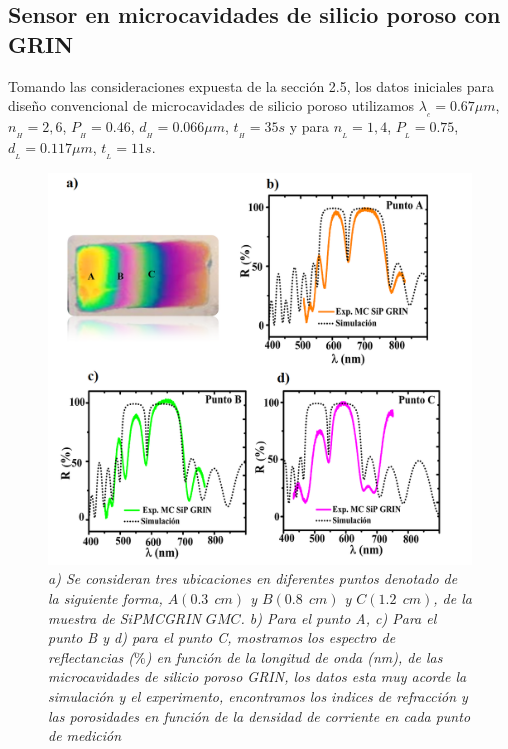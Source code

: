 \documentclass[a4paper,11pt,]{book}
\begin{document}
\subsection{Sensor en microcavidades de silicio poroso con GRIN }
Tomando las consideraciones expuesta de la sección 2.5,  los  datos iniciales para diseño convencional de microcavidades de silicio poroso  utilizamos $\lambda_{_{c}}= 0.67 \mu m$, $n_{_{H}} =2,6$, $P_{_{H}} =0.46$, $d_{_{H}}=0.066 \mu m  $, $t_{_{H}}=35 s  $ y para  $n_{_{L}}= 1,4$,  $P_{_{L}} =0.75$, $d_{_{L}}=0.117 \mu m  $, $t_{_{L}}=11 s  $. 
\begin{figure}[H]
	\centering
	\includegraphics[scale=.3]{../Images/MCGRIN1}
	\caption{\emph{a) Se consideran tres ubicaciones en diferentes puntos denotado de la siguiente forma,  $A(0.3\ \ cm)$ y $ B(0.8 \ \  cm)$ y $ C(1.2 \ \  cm)$, de la  muestra de SiPMCGRIN $GMC$.  b) Para el punto A, c) Para el punto B y d) para el punto C, mostramos los espectro de reflectancias ($\%$) en función de la longitud de onda (nm), de las microcavidades de silicio poroso GRIN,  los datos esta muy acorde la simulación y el experimento, encontramos los indices de refracción y las porosidades en función de la densidad de corriente en cada punto de medición}}
	\label{fig:MCGRIN03}
\end{figure}
\end{document}
